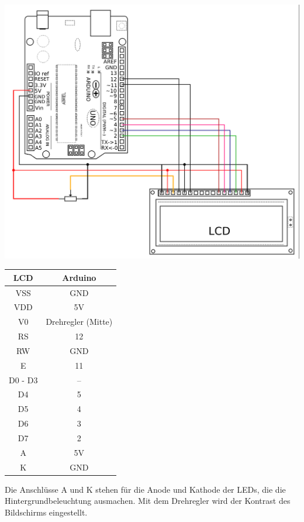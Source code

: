 \bigskip
\begin{minipage}{0.64\textwidth}
	\centering
	\includegraphics[width=\textwidth]{./Zeichnungen/schaltplan-lcd-ohne-i2c.png}
\end{minipage}
\hfill
\begin{minipage}{0.34\textwidth}
	\small
	\centering
	\begin{tabular}{c|c}
		\textbf{LCD} & \textbf{Arduino} \\ \hline
		VSS & GND \\ \hline
		VDD & 5V \\ \hline
		V0 & Drehregler (Mitte)\\ \hline
		RS & 12\\ \hline
		RW & GND\\ \hline
		E & 11\\ \hline
		D0 - D3 & -- \\ \hline
		D4 & 5\\ \hline
		D5 & 4\\ \hline
		D6 & 3\\ \hline
		D7 & 2\\ \hline
		A & 5V\\ \hline
		K & GND\\ \hline
	\end{tabular}
\end{minipage}

\bigskip
Die Anschlüsse A und K stehen für die Anode und Kathode der LEDs, die die Hintergrundbeleuchtung ausmachen. Mit dem Drehregler wird der Kontrast des Bildschirms eingestellt.


